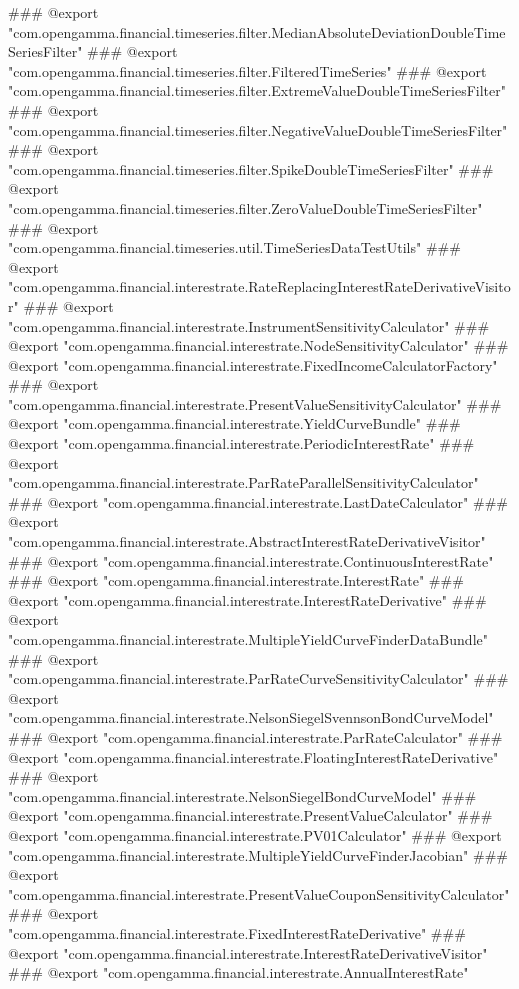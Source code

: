 ### @export "com.opengamma.financial.timeseries.filter.MedianAbsoluteDeviationDoubleTimeSeriesFilter"
### @export "com.opengamma.financial.timeseries.filter.FilteredTimeSeries"
### @export "com.opengamma.financial.timeseries.filter.ExtremeValueDoubleTimeSeriesFilter"
### @export "com.opengamma.financial.timeseries.filter.NegativeValueDoubleTimeSeriesFilter"
### @export "com.opengamma.financial.timeseries.filter.SpikeDoubleTimeSeriesFilter"
### @export "com.opengamma.financial.timeseries.filter.ZeroValueDoubleTimeSeriesFilter"
### @export "com.opengamma.financial.timeseries.util.TimeSeriesDataTestUtils"
### @export "com.opengamma.financial.interestrate.RateReplacingInterestRateDerivativeVisitor"
### @export "com.opengamma.financial.interestrate.InstrumentSensitivityCalculator"
### @export "com.opengamma.financial.interestrate.NodeSensitivityCalculator"
### @export "com.opengamma.financial.interestrate.FixedIncomeCalculatorFactory"
### @export "com.opengamma.financial.interestrate.PresentValueSensitivityCalculator"
### @export "com.opengamma.financial.interestrate.YieldCurveBundle"
### @export "com.opengamma.financial.interestrate.PeriodicInterestRate"
### @export "com.opengamma.financial.interestrate.ParRateParallelSensitivityCalculator"
### @export "com.opengamma.financial.interestrate.LastDateCalculator"
### @export "com.opengamma.financial.interestrate.AbstractInterestRateDerivativeVisitor"
### @export "com.opengamma.financial.interestrate.ContinuousInterestRate"
### @export "com.opengamma.financial.interestrate.InterestRate"
### @export "com.opengamma.financial.interestrate.InterestRateDerivative"
### @export "com.opengamma.financial.interestrate.MultipleYieldCurveFinderDataBundle"
### @export "com.opengamma.financial.interestrate.ParRateCurveSensitivityCalculator"
### @export "com.opengamma.financial.interestrate.NelsonSiegelSvennsonBondCurveModel"
### @export "com.opengamma.financial.interestrate.ParRateCalculator"
### @export "com.opengamma.financial.interestrate.FloatingInterestRateDerivative"
### @export "com.opengamma.financial.interestrate.NelsonSiegelBondCurveModel"
### @export "com.opengamma.financial.interestrate.PresentValueCalculator"
### @export "com.opengamma.financial.interestrate.PV01Calculator"
### @export "com.opengamma.financial.interestrate.MultipleYieldCurveFinderJacobian"
### @export "com.opengamma.financial.interestrate.PresentValueCouponSensitivityCalculator"
### @export "com.opengamma.financial.interestrate.FixedInterestRateDerivative"
### @export "com.opengamma.financial.interestrate.InterestRateDerivativeVisitor"
### @export "com.opengamma.financial.interestrate.AnnualInterestRate"
